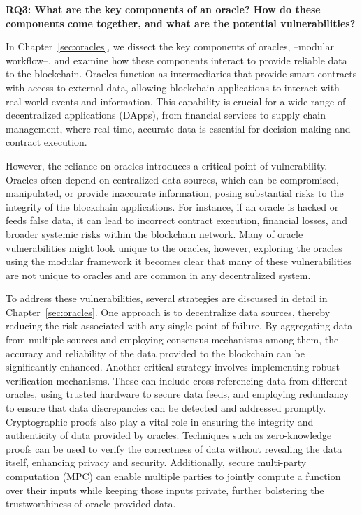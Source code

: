 \textbf{RQ3: What are the key components of an oracle? How do these components come together, and what are the potential vulnerabilities?}

In Chapter~\ref{sec:oracles}, we dissect the key components of oracles, --modular workflow--, and examine how these components interact to provide reliable data to the blockchain. Oracles function as intermediaries that provide smart contracts with access to external data, allowing blockchain applications to interact with real-world events and information. This capability is crucial for a wide range of decentralized applications (DApps), from financial services to supply chain management, where real-time, accurate data is essential for decision-making and contract execution. 

However, the reliance on oracles introduces a critical point of vulnerability. Oracles often depend on centralized data sources, which can be compromised, manipulated, or provide inaccurate information, posing substantial risks to the integrity of the blockchain applications. For instance, if an oracle is hacked or feeds false data, it can lead to incorrect contract execution, financial losses, and broader systemic risks within the blockchain network. Many of oracle vulnerabilities might look unique to the oracles, however, exploring the oracles using the modular framework it becomes clear that many of these vulnerabilities are not unique to oracles and are common in any decentralized system.

To address these vulnerabilities, several strategies are discussed in detail in Chapter~\ref{sec:oracles}. One approach is to decentralize data sources, thereby reducing the risk associated with any single point of failure. By aggregating data from multiple sources and employing consensus mechanisms among them, the accuracy and reliability of the data provided to the blockchain can be significantly enhanced. Another critical strategy involves implementing robust verification mechanisms. These can include cross-referencing data from different oracles, using trusted hardware to secure data feeds, and employing redundancy to ensure that data discrepancies can be detected and addressed promptly. Cryptographic proofs also play a vital role in ensuring the integrity and authenticity of data provided by oracles. Techniques such as zero-knowledge proofs can be used to verify the correctness of data without revealing the data itself, enhancing privacy and security. Additionally, secure multi-party computation (MPC) can enable multiple parties to jointly compute a function over their inputs while keeping those inputs private, further bolstering the trustworthiness of oracle-provided data.

